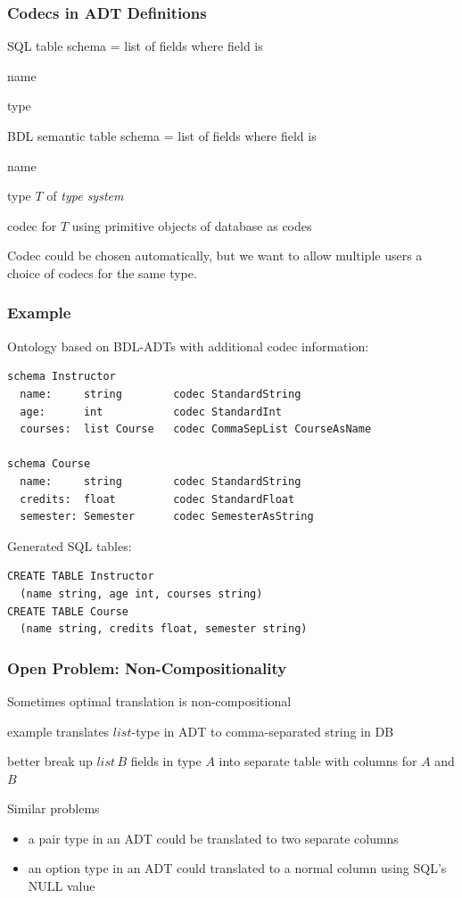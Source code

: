 \begin{frame}\frametitle{Codecs in ADT Definitions}
\begin{blockitems}{SQL table schema = list of fields where field is}
\item name
\item type 
\end{blockitems}

\begin{blockitems}{BDL semantic table schema = list of fields where field is}
\item name
\item type $T$ of \emph{type system} 
\item codec for $T$ using primitive objects of database as codes
\end{blockitems}

Codec could be chosen automatically, but we want to allow multiple users a choice of codecs for the same type.
\end{frame}

\begin{frame}[fragile]\frametitle{Example}
Ontology based on BDL-ADTs with additional codec information:
\begin{lstlisting}[basicstyle=\footnotesize]
schema Instructor
  name:     string        codec StandardString
  age:      int           codec StandardInt
  courses:  list Course   codec CommaSepList CourseAsName

schema Course
  name:     string        codec StandardString
  credits:  float         codec StandardFloat
  semester: Semester      codec SemesterAsString
\end{lstlisting}
\medskip

Generated SQL tables:
\begin{lstlisting}[basicstyle=\footnotesize]
CREATE TABLE Instructor
  (name string, age int, courses string)
CREATE TABLE Course
  (name string, credits float, semester string)
\end{lstlisting}
\end{frame}

\begin{frame}\frametitle{Open Problem: Non-Compositionality}
\begin{blockitems}{Sometimes optimal translation is non-compositional}
\item example translates $list$-type in ADT to comma-separated string in DB
\item better break up $list\,B$ fields in type $A$ into separate table with columns for $A$ and $B$
\end{blockitems}

Similar problems
\begin{itemize}
\item a pair type in an ADT could be translated to two separate columns
\item an option type in an ADT could translated to a normal column using SQL's NULL value
\end{itemize}
\end{frame}

